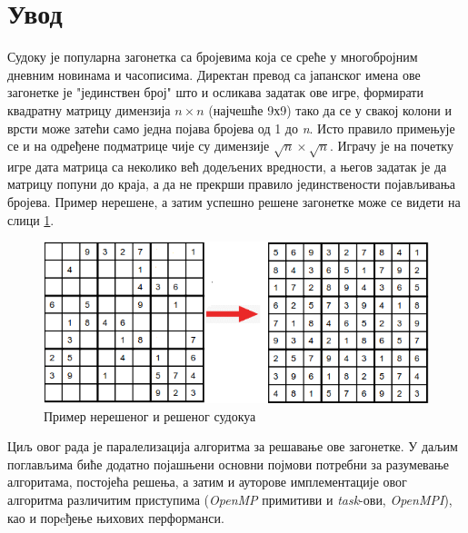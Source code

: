 \section{Увод}
Судоку је популарна загонетка са бројевима која се среће у многобројним дневним новинама  и часописима. Директан превод са јапанског имена ове загонетке је "јединствен број" што и осликава задатак ове игре, формирати квадратну матрицу димензија \(n \times n\) (најчешће 9х9) тако да се у свакој колони и врсти може затећи само једна појава бројева од 1 до \textit{n}. Исто правило примењује се и на одређене подматрице чије су димензије \(\sqrt{n} \times \sqrt{n}\). Играчу је на почетку игре дата матрица са неколико већ додељених вредности, а његов задатак је да матрицу попуни до краја, а да не прекрши правило јединствености појављивања бројева. Пример нерешене, а затим успешно решене загонетке може се видети на слици \ref{fig:unsolved_solved}.

\begin{figure}[H]
    \centering
    \includegraphics[width=1\textwidth]{images/unsolved_solved.png}
    \caption{Пример нерешеног и решеног судокуа}
    \label{fig:unsolved_solved}
\end{figure}

Циљ овог рада је паралелизација алгоритма за решавање ове загонетке. У даљим поглављима биће додатно појашњени основни појмови потребни за разумевање алгоритама, постојећа решења, а затим и ауторове имплементације овог алгоритма различитим приступима (\textit{OpenMP} примитиви и \textit{task}-ови, \textit{OpenMPI}), као и порeђење њихових перформанси.